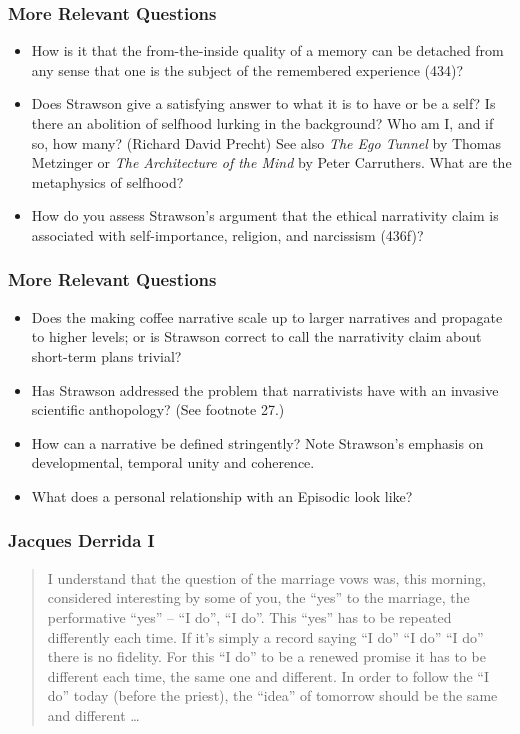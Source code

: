 \documentclass[xcolor=dvipsnames]{beamer}
\begin{document}
\begin{frame}
  \frametitle{More Relevant Questions}
  \begin{itemize}
  \item How is it that the from-the-inside quality of a memory can be
    detached from any sense that one is the subject of the remembered
    experience (434)?
  \item Does Strawson give a satisfying answer to what it is to have
    or be a self? Is there an abolition of selfhood lurking in the
    background? Who am I, and if so, how many? (Richard David Precht)
    See also \emph{The Ego Tunnel} by Thomas Metzinger or \emph{The
      Architecture of the Mind} by Peter Carruthers. What are the
    metaphysics of selfhood?
  \item How do you assess Strawson's argument that the ethical
    narrativity claim is associated with self-importance, religion,
    and narcissism (436f)?
  \end{itemize}
\end{frame}

\begin{frame}
  \frametitle{More Relevant Questions}
  \begin{itemize}
  \item Does the making coffee narrative scale up to larger narratives
    and propagate to higher levels; or is Strawson correct to call the
    narrativity claim about short-term plans trivial?
  \item Has Strawson addressed the problem that narrativists have with
    an invasive scientific anthopology? (See footnote 27.)
  \item How can a narrative be defined stringently? Note Strawson's
    emphasis on developmental, temporal unity and coherence.
  \item What does a personal relationship with an Episodic look like?
  \end{itemize}
\end{frame}

\begin{frame}
  \frametitle{Jacques Derrida I}
  \begin{quote}
    I understand that the question of the marriage vows was, this
    morning, considered interesting by some of you, the ``yes'' to the
    marriage, the performative ``yes'' -- ``I do'', ``I do''. This
    ``yes'' has to be repeated differently each time. If it's simply a
    record saying ``I do'' ``I do'' ``I do'' there is no fidelity. For
    this ``I do'' to be a renewed promise it has to be different each
    time, the same one and different. In order to follow the ``I do''
    today (before the priest), the ``idea'' of tomorrow should be the
    same and different {\ldots}
  \end{quote}
\end{frame}
\end{document}

